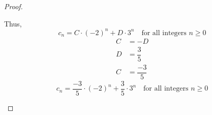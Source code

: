 \begin{proof}
\begin{enumerate}
            Thus,
            \begin{equation*}
                c_n = C\cdot (-2)^n + D\cdot 3^n \quad \text{for all integers $n \geq 0$}
            \end{equation*}
            \vspace{-\baselineskip}
            \begin{align*}
                C &= - D \\
                D &= \dfrac{3}{5} \\
                C &= \dfrac{-3}{5}
            \end{align*}
            \vspace{-\baselineskip}
            \begin{equation*}
                c_n = \dfrac{-3}{5}\cdot (-2)^n + \dfrac{3}{5}\cdot 3^n \quad \text{for all integers $n \geq 0$}
            \end{equation*}
    \end{enumerate}
\end{proof}

